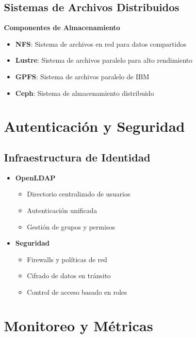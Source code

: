 \subsection{Sistemas de Archivos Distribuidos}
\begin{infocaja}
\textbf{Componentes de Almacenamiento}
\begin{itemize}
    \item \textbf{NFS}: Sistema de archivos en red para datos compartidos
    \item \textbf{Lustre}: Sistema de archivos paralelo para alto rendimiento
    \item \textbf{GPFS}: Sistema de archivos paralelo de IBM
    \item \textbf{Ceph}: Sistema de almacenamiento distribuido
\end{itemize}
\end{infocaja}

\section{Autenticación y Seguridad}
\subsection{Infraestructura de Identidad}
\begin{itemize}
    \item \textbf{OpenLDAP}
    \begin{itemize}
        \item Directorio centralizado de usuarios
        \item Autenticación unificada
        \item Gestión de grupos y permisos
    \end{itemize}
    \item \textbf{Seguridad}
    \begin{itemize}
        \item Firewalls y políticas de red
        \item Cifrado de datos en tránsito
        \item Control de acceso basado en roles
    \end{itemize}
\end{itemize}

\section{Monitoreo y Métricas}
